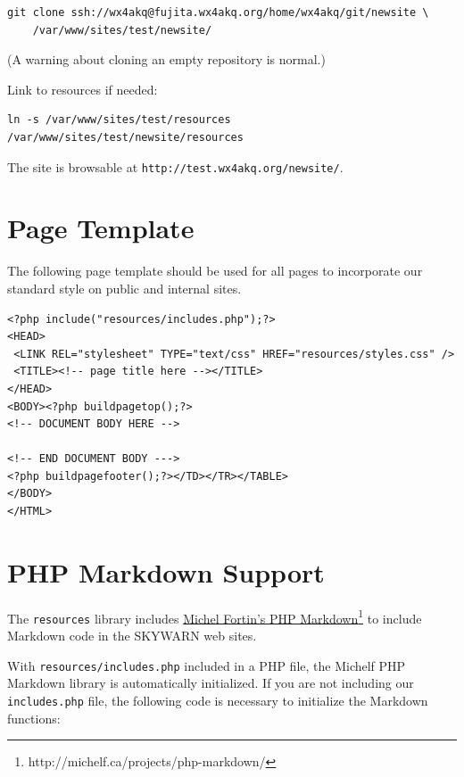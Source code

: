 \documentclass[pdflatex,letterpaper,twoside,12pt]{book}
\begin{document}
\begin{verbatim}
git clone ssh://wx4akq@fujita.wx4akq.org/home/wx4akq/git/newsite \
	/var/www/sites/test/newsite/
\end{verbatim}

(A warning about cloning an empty repository is normal.)

Link to resources if needed:

\begin{verbatim}
ln -s /var/www/sites/test/resources /var/www/sites/test/newsite/resources
\end{verbatim}

The site is browsable at \texttt{http://test.wx4akq.org/newsite/}.


\section{Page Template}

The following page template should be used for all pages to incorporate our standard style on public and internal sites.
\pagebreak
\begin{verbatim}
<?php include("resources/includes.php");?>
<HEAD>
 <LINK REL="stylesheet" TYPE="text/css" HREF="resources/styles.css" />
 <TITLE><!-- page title here --></TITLE>
</HEAD>
<BODY><?php buildpagetop();?>
<!-- DOCUMENT BODY HERE -->

<!-- END DOCUMENT BODY --->
<?php buildpagefooter();?></TD></TR></TABLE>
</BODY>
</HTML>
\end{verbatim}


\section{PHP Markdown Support}

The \texttt{resources} library includes \href{http://michelf.ca/projects/php-markdown/}{Michel Fortin's PHP Markdown}\footnote{http://michelf.ca/projects/php-markdown/} to include Markdown code in the SKYWARN web sites.

With \texttt{resources/includes.php} included in a PHP file, the Michelf PHP Markdown library is automatically initialized.  If you are not including our \texttt{includes.php} file, the following code is necessary to initialize the Markdown functions:
\end{document}
